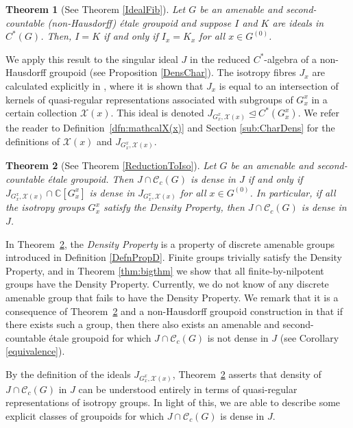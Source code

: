 \documentclass[11pt, oneside, reqno]{amsart}
\newcommand{\Gu}{G^{(0)}}
\newcommand{\cg}{\mathscr{C}_c(G)}
\newtheorem{introthm}{Theorem}
\theoremstyle{definition}
\theoremstyle{remark}
\numberwithin{equation}{section}
\begin{document}
\begin{introthm}[See Theorem \ref{IdealFib}]\label{IntroIdealFib}
    Let $G$ be an amenable and second-countable (non-Hausdorff) \'etale groupoid and suppose $I$ and $K$ are ideals in $C^*(G)$. Then, $I = K$ if and only if $I_{x} = K_{x}$ for all $x\in \Gu$.
\end{introthm}

We apply this result to the singular ideal $J$ in the reduced $C^*$-algebra of a non-Hausdorff groupoid (see Proposition \ref{DensChar}).
The isotropy fibres $J_{x}$ are calculated explicitly in \cite[Theorem~5.5]{Hume}, where it is shown that $J_{x}$ is equal to an intersection of kernels of quasi-regular representations associated with subgroups of $G^{x}_{x}$ in a certain collection $\mathcal{X}(x)$. This ideal is denoted $J_{G^x_x, \mathcal{X}(x)} \trianglelefteq C^*(G^x_x)$. We refer the reader to Definition~\ref{dfn:mathcalX(x)} and Section \ref{sub:CharDens} for the definitions of $\mathcal{X}(x)$ and $J_{G^x_x, \mathcal{X}(x)}$. %

\begin{introthm}[See Theorem \ref{ReductionToIso}]\label{IntroReduct}
    Let $G$ be an amenable and second-countable \'etale groupoid. Then $J\cap\cg$ is dense in $J$ if and only if $J_{G^x_x, \mathcal{X}(x)} \cap \mathbb{C}[G^x_x]$ is dense in $J_{G^x_x, \mathcal{X}(x)}$ for all $x \in \Gu$. In particular, if all the isotropy groups $G^x_x$ satisfy the Density Property, then $J\cap\cg$ is dense in $J$.
\end{introthm}

In Theorem~\ref{IntroReduct}, the \emph{Density Property} is a property of discrete amenable groups introduced in Definition \ref{DefnPropD}. Finite groups trivially satisfy the Density Property, and in Theorem \ref{thm:bigthm} we show that all finite-by-nilpotent groups have the Density Property. Currently, we do not know of any discrete amenable group that fails to have the Density Property. We remark that it is a consequence of Theorem~\ref{IntroReduct} and a non-Hausdorff groupoid construction in \cite[Section~6]{Hume} that if there exists such a group, then there also exists an amenable and second-countable \'etale groupoid for which $J\cap\cg$ is not dense in $J$ (see Corollary \ref{equivalence}).

By the definition of the ideals $J_{G^x_x, \mathcal{X}(x)}$, Theorem~\ref{IntroReduct} asserts that density of $J \cap \cg$ in $J$ can be understood entirely in terms of quasi-regular representations of isotropy groups. In light of this, we are able to describe some explicit classes of groupoids for which $J \cap \cg$ is dense in $J$.
\end{document}
